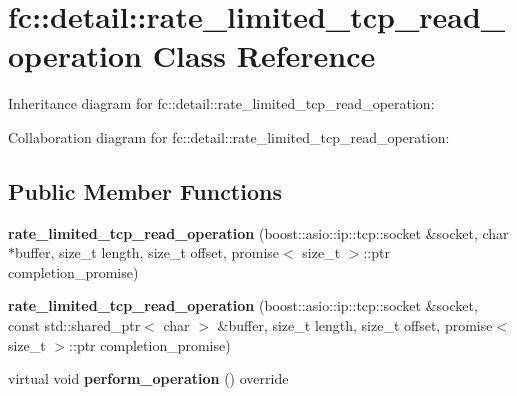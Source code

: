 \hypertarget{classfc_1_1detail_1_1rate__limited__tcp__read__operation}{}\section{fc\+:\+:detail\+:\+:rate\+\_\+limited\+\_\+tcp\+\_\+read\+\_\+operation Class Reference}
\label{classfc_1_1detail_1_1rate__limited__tcp__read__operation}


Inheritance diagram for fc\+:\+:detail\+:\+:rate\+\_\+limited\+\_\+tcp\+\_\+read\+\_\+operation\+:


Collaboration diagram for fc\+:\+:detail\+:\+:rate\+\_\+limited\+\_\+tcp\+\_\+read\+\_\+operation\+:
\subsection*{Public Member Functions}
\begin{DoxyCompactItemize}
\item 
\mbox{\label{classfc_1_1detail_1_1rate__limited__tcp__read__operation_a73b436865498dde61f65d6f5c2480ed1}} 
{\bfseries rate\+\_\+limited\+\_\+tcp\+\_\+read\+\_\+operation} (boost\+::asio\+::ip\+::tcp\+::socket \&socket, char $\ast$buffer, size\+\_\+t length, size\+\_\+t offset, promise$<$ size\+\_\+t $>$\+::ptr completion\+\_\+promise)
\item 
\mbox{\label{classfc_1_1detail_1_1rate__limited__tcp__read__operation_a1249ab1b3f073593278b421f9739630b}} 
{\bfseries rate\+\_\+limited\+\_\+tcp\+\_\+read\+\_\+operation} (boost\+::asio\+::ip\+::tcp\+::socket \&socket, const std\+::shared\+\_\+ptr$<$ char $>$ \&buffer, size\+\_\+t length, size\+\_\+t offset, promise$<$ size\+\_\+t $>$\+::ptr completion\+\_\+promise)
\item 
\mbox{\label{classfc_1_1detail_1_1rate__limited__tcp__read__operation_a2a3b725337858366df8ba839db3e4b4b}} 
virtual void {\bfseries perform\+\_\+operation} () override
\end{DoxyCompactItemize}
